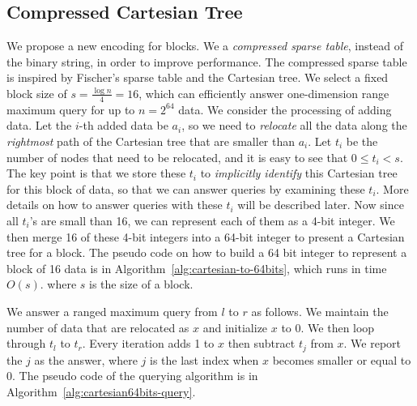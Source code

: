 
\subsection{Compressed Cartesian Tree}

We propose a new encoding for blocks.  We a {\em compressed sparse
  table}, instead of the binary string, in order to improve
performance.  The compressed sparse table is inspired by Fischer's
sparse table and the Cartesian tree.  We select a fixed block size of
$s = {{\frac{\log n}{4}}} = 16$, which can efficiently answer
one-dimension range maximum query for up to $n = 2^{64}$ data.  We
consider the processing of adding data.  Let the $i$-th added data be
$a_i$, so we need to {\em relocate} all the data along the {\em
  rightmost} path of the Cartesian tree that are smaller than $a_i$.
Let $t_i$ be the number of nodes that need to be relocated, and it
is easy to see that $0 \le t_i < s$.  The key point is that we store
these $t_i$ to {\em implicitly identify} this Cartesian tree for this
block of data, so that we can answer queries by examining these $t_i$.
More details on how to answer queries with these $t_i$ will be
described later.  Now since all $t_i$'s are small than 16, we can
represent each of them as a 4-bit integer.  We then merge 16 of these
4-bit integers into a 64-bit integer to present a Cartesian tree for a
block.  The pseudo code on how to build a 64 bit integer to represent
a block of 16 data is in Algorithm~\ref{alg:cartesian-to-64bits},
which runs in time $O(s)$. where $s$ is the size of a block.



We answer a ranged maximum query from $l$ to $r$ as follows.  We
maintain the number of data that are relocated as $x$ and
initialize $x$ to 0.  We then loop through $t_l$ to $t_r$.  Every
iteration adds 1 to $x$ then subtract $t_j$ from $x$.  We report the
$j$ as the answer, where $j$ is the last index when $x$ becomes
smaller or equal to 0.  The pseudo code of the querying algorithm is
in Algorithm~\ref{alg:cartesian64bits-query}.

